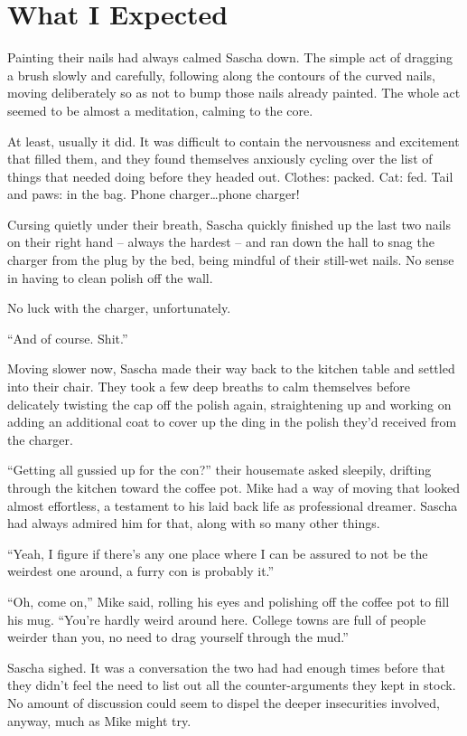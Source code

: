 \chapter{What I Expected}

Painting their nails had always calmed Sascha down. The simple act of dragging a brush slowly and carefully, following along the contours of the curved nails, moving deliberately so as not to bump those nails already painted. The whole act seemed to be almost a meditation, calming to the core.

At least, usually it did. It was difficult to contain the nervousness and excitement that filled them, and they found themselves anxiously cycling over the list of things that needed doing before they headed out. Clothes: packed. Cat: fed. Tail and paws: in the bag. Phone charger\ldots{}phone charger!

Cursing quietly under their breath, Sascha quickly finished up the last two nails on their right hand -- always the hardest -- and ran down the hall to snag the charger from the plug by the bed, being mindful of their still-wet nails. No sense in having to clean polish off the wall.

No luck with the charger, unfortunately.

``And of course. Shit.''

Moving slower now, Sascha made their way back to the kitchen table and settled into their chair. They took a few deep breaths to calm themselves before delicately twisting the cap off the polish again, straightening up and working on adding an additional coat to cover up the ding in the polish they'd received from the charger.

``Getting all gussied up for the con?'' their housemate asked sleepily, drifting through the kitchen toward the coffee pot. Mike had a way of moving that looked almost effortless, a testament to his laid back life as professional dreamer. Sascha had always admired him for that, along with so many other things.

``Yeah, I figure if there's any one place where I can be assured to not be the weirdest one around, a furry con is probably it.''

``Oh, come on,'' Mike said, rolling his eyes and polishing off the coffee pot to fill his mug. ``You're hardly weird around here. College towns are full of people weirder than you, no need to drag yourself through the mud.''

Sascha sighed. It was a conversation the two had had enough times before that they didn't feel the need to list out all the counter-arguments they kept in stock. No amount of discussion could seem to dispel the deeper insecurities involved, anyway, much as Mike might try.

